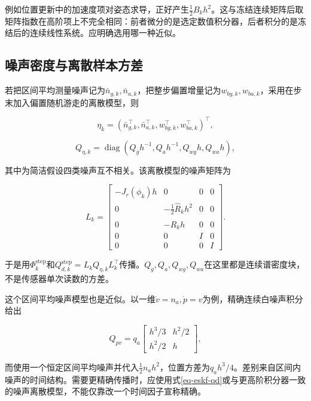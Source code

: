 例如位置更新中的加速度项对姿态求导，正好产生$\frac12B_kh^2$。这与冻结连续矩阵后取矩阵指数在高阶项上不完全相同：前者微分的是选定数值积分器，后者积分的是冻结后的连续线性系统。应明确选用哪一种近似。

\subsection{噪声密度与离散样本方差}

若把区间平均测量噪声记为$\bar n_{g,k},\bar n_{a,k}$，把整步偏置增量记为$w_{bg,k},w_{ba,k}$，采用在步末加入偏置随机游走的离散模型，则

\begin{equation*}
\eta_k=(\bar n_{g,k}^\top,\bar n_{a,k}^\top,
                 w_{bg,k}^\top,w_{ba,k}^\top)^\top,
\end{equation*}

\begin{equation*}
Q_{\eta,k}=\operatorname{diag}
       (Q_gh^{-1},Q_ah^{-1},Q_{wg}h,Q_{wa}h),
\end{equation*}

其中为简洁假设四类噪声互不相关。该离散模型的噪声矩阵为

\begin{equation*}
L_k=\begin{bmatrix}
 -J_r(\phi_k)h&0&0&0\\
 0&-\tfrac12\hat R_kh^2&0&0\\
 0&-\hat R_kh&0&0\\
 0&0&I&0\\
 0&0&0&I
 \end{bmatrix}.
\end{equation*}

于是用$\Phi_k^{\mathrm{step}}$和$Q_{d,k}^{\mathrm{step}}=L_kQ_{\eta,k}L_k^\top$传播。$Q_g,Q_a,Q_{wg},Q_{wa}$在这里都是连续谱密度块，不是传感器单次读数的方差。

这个区间平均噪声模型也是近似。以一维$\dot v=n_a,\dot p=v$为例，精确连续白噪声积分给出

\begin{equation*}
Q_{pv}=q_a\begin{bmatrix}h^3/3&h^2/2\\h^2/2&h\end{bmatrix},
\end{equation*}

而使用一个恒定区间平均噪声并代入$\frac12n_ah^2$，位置方差为$q_ah^3/4$。差别来自区间内噪声的时间结构。需要更精确传播时，应使用式\eqref{eq-eskf-qd}或与更高阶积分器一致的噪声离散模型，不能仅靠改一个时间因子宣称精确。

